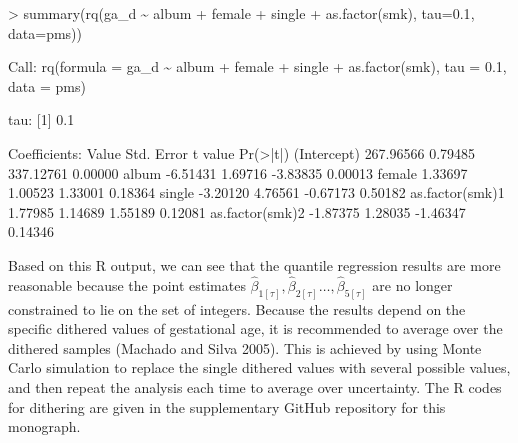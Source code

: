 \documentclass[
  letterpaper,
  DIV=11,
  numbers=noendperiod]{scrartcl}
\newenvironment{Shaded}{\begin{snugshade}}{\end{snugshade}}
\newcommand{\AttributeTok}[1]{\textcolor[rgb]{0.40,0.45,0.13}{#1}}
\newcommand{\DecValTok}[1]{\textcolor[rgb]{0.68,0.00,0.00}{#1}}
\newcommand{\ErrorTok}[1]{\textcolor[rgb]{0.68,0.00,0.00}{#1}}
\newcommand{\FloatTok}[1]{\textcolor[rgb]{0.68,0.00,0.00}{#1}}
\newcommand{\FunctionTok}[1]{\textcolor[rgb]{0.28,0.35,0.67}{#1}}
\newcommand{\NormalTok}[1]{\textcolor[rgb]{0.00,0.23,0.31}{#1}}
\newcommand{\SpecialCharTok}[1]{\textcolor[rgb]{0.37,0.37,0.37}{#1}}
\begin{document}
\begin{Shaded}
\begin{Highlighting}[]
\SpecialCharTok{\textgreater{}} \FunctionTok{summary}\NormalTok{(}\FunctionTok{rq}\NormalTok{(ga\_d }\SpecialCharTok{\textasciitilde{}}\NormalTok{ album }\SpecialCharTok{+}\NormalTok{ female }\SpecialCharTok{+}\NormalTok{ single }\SpecialCharTok{+} \FunctionTok{as.factor}\NormalTok{(smk), }\AttributeTok{tau=}\FloatTok{0.1}\NormalTok{, }\AttributeTok{data=}\NormalTok{pms))}

\NormalTok{Call}\SpecialCharTok{:} \FunctionTok{rq}\NormalTok{(}\AttributeTok{formula =}\NormalTok{ ga\_d }\SpecialCharTok{\textasciitilde{}}\NormalTok{ album }\SpecialCharTok{+}\NormalTok{ female }\SpecialCharTok{+}\NormalTok{ single }\SpecialCharTok{+} \FunctionTok{as.factor}\NormalTok{(smk),}
    \AttributeTok{tau =} \FloatTok{0.1}\NormalTok{, }\AttributeTok{data =}\NormalTok{ pms)}

\NormalTok{tau}\SpecialCharTok{:}\NormalTok{ [}\DecValTok{1}\NormalTok{] }\FloatTok{0.1}

\NormalTok{Coefficients}\SpecialCharTok{:}
\NormalTok{                Value     Std. Error t value   }\FunctionTok{Pr}\NormalTok{(}\SpecialCharTok{\textgreater{}}\ErrorTok{|}\NormalTok{t}\SpecialCharTok{|}\NormalTok{)}
\NormalTok{(Intercept)     }\FloatTok{267.96566}   \FloatTok{0.79485}  \FloatTok{337.12761}   \FloatTok{0.00000}
\NormalTok{album            }\SpecialCharTok{{-}}\FloatTok{6.51431}   \FloatTok{1.69716}   \SpecialCharTok{{-}}\FloatTok{3.83835}   \FloatTok{0.00013}
\NormalTok{female            }\FloatTok{1.33697}   \FloatTok{1.00523}    \FloatTok{1.33001}   \FloatTok{0.18364}
\NormalTok{single           }\SpecialCharTok{{-}}\FloatTok{3.20120}   \FloatTok{4.76561}   \SpecialCharTok{{-}}\FloatTok{0.67173}   \FloatTok{0.50182}
\FunctionTok{as.factor}\NormalTok{(smk)}\DecValTok{1}   \FloatTok{1.77985}   \FloatTok{1.14689}    \FloatTok{1.55189}   \FloatTok{0.12081}
\FunctionTok{as.factor}\NormalTok{(smk)}\DecValTok{2}  \SpecialCharTok{{-}}\FloatTok{1.87375}   \FloatTok{1.28035}   \SpecialCharTok{{-}}\FloatTok{1.46347}   \FloatTok{0.14346}
\end{Highlighting}
\end{Shaded}

Based on this R output, we can see that the quantile regression results
are more reasonable because the point estimates
\(\hat{\beta}_{1 [\tau]}, \hat{\beta}_{2 [\tau]} \dots , \hat{\beta}_{5 [\tau]}\)
are no longer constrained to lie on the set of integers. Because the
results depend on the specific dithered values of gestational age, it is
recommended to average over the dithered samples (Machado and Silva
2005). This is achieved by using Monte Carlo simulation to replace the
single dithered values with several possible values, and then repeat the
analysis each time to average over uncertainty. The R codes for
dithering are given in the supplementary GitHub repository for this
monograph.
\end{document}
